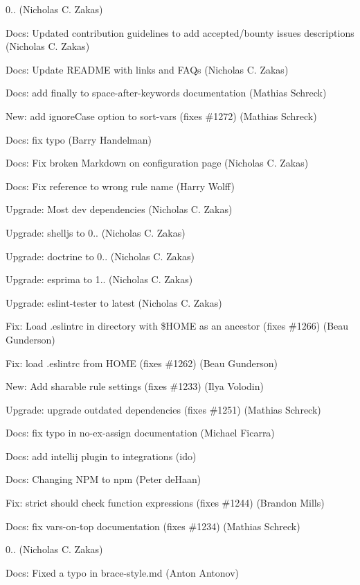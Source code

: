 \begin{DoxyItemize}
\item 0.. (Nicholas C. Zakas)
\item Docs\+: Updated contribution guidelines to add accepted/bounty issues descriptions (Nicholas C. Zakas)
\item Docs\+: Update R\+E\+A\+D\+ME with links and F\+A\+Qs (Nicholas C. Zakas)
\item Docs\+: add finally to space-\/after-\/keywords documentation (Mathias Schreck)
\item New\+: add ignore\+Case option to sort-\/vars (fixes \#1272) (Mathias Schreck)
\item Docs\+: fix typo (Barry Handelman)
\item Docs\+: Fix broken Markdown on configuration page (Nicholas C. Zakas)
\item Docs\+: Fix reference to wrong rule name (Harry Wolff)
\item Upgrade\+: Most dev dependencies (Nicholas C. Zakas)
\item Upgrade\+: shelljs to 0.. (Nicholas C. Zakas)
\item Upgrade\+: doctrine to 0.. (Nicholas C. Zakas)
\item Upgrade\+: esprima to 1.. (Nicholas C. Zakas)
\item Upgrade\+: eslint-\/tester to latest (Nicholas C. Zakas)
\item Fix\+: Load .eslintrc in directory with \$\+H\+O\+ME as an ancestor (fixes \#1266) (Beau Gunderson)
\item Fix\+: load .eslintrc from H\+O\+ME (fixes \#1262) (Beau Gunderson)
\item New\+: Add sharable rule settings (fixes \#1233) (Ilya Volodin)
\item Upgrade\+: upgrade outdated dependencies (fixes \#1251) (Mathias Schreck)
\item Docs\+: fix typo in no-\/ex-\/assign documentation (Michael Ficarra)
\item Docs\+: add intellij plugin to integrations (ido)
\item Docs\+: Changing N\+PM to npm (Peter de\+Haan)
\item Fix\+: strict should check function expressions (fixes \#1244) (Brandon Mills)
\item Docs\+: fix vars-\/on-\/top documentation (fixes \#1234) (Mathias Schreck)
\item 0.. (Nicholas C. Zakas)
\item Docs\+: Fixed a typo in brace-\/style.\+md (Anton Antonov)
\end{DoxyItemize}

